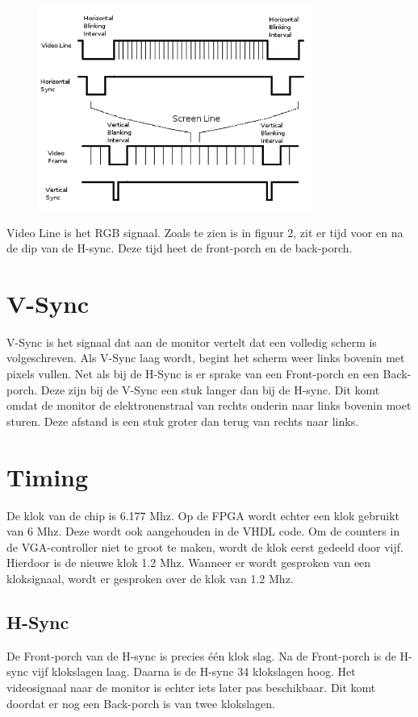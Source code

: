 \documentclass[oneside,dutch]{tudelft-report}
\begin{document}
\begin{figure}[H]
\center
\includegraphics[width=9cm]{VGA_signal_format}
\caption{}
\label{VGA}
\end{figure}

Video Line is het RGB signaal. Zoals te zien is in figuur 2, zit er tijd voor en na de dip van de H-sync. Deze tijd heet de front-porch en de back-porch. 

\section{V-Sync}
V-Sync is het signaal dat aan de monitor vertelt dat een volledig scherm is volgeschreven. Als V-Sync laag wordt, begint het scherm weer links bovenin met pixels vullen. Net als bij de H-Sync is er sprake van een Front-porch en een Back-porch. Deze zijn bij de V-Sync een stuk langer dan bij de H-sync. Dit komt omdat de monitor de elektronenstraal van rechts onderin naar links bovenin moet sturen. Deze afstand is een stuk groter dan terug van rechts naar links. 

\section{Timing}
De klok van de chip is 6.177 Mhz. Op de FPGA wordt echter een klok gebruikt van 6 Mhz. Deze wordt ook aangehouden in de VHDL code. Om de counters in de VGA-controller niet te groot te maken, wordt de klok eerst gedeeld door vijf. Hierdoor is de nieuwe klok 1.2 Mhz. Wanneer er wordt gesproken van een kloksignaal, wordt er gesproken over de klok van 1.2 Mhz.

\subsection{H-Sync}
De Front-porch van de H-sync is precies één klok slag. Na de Front-porch is de H-sync vijf klokslagen laag. Daarna is de H-sync 34 klokslagen hoog. Het videosignaal naar de monitor is echter iets later pas beschikbaar. Dit komt doordat er nog een Back-porch is van twee klokslagen. 
\end{document}
